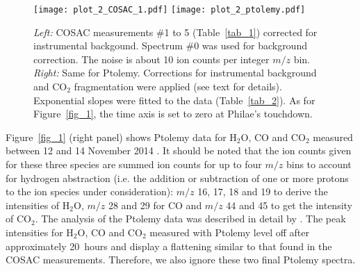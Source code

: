 \documentclass{aa}
\begin{document}
\begin{figure*}
\vspace{-8mm}
   \centering
   \hspace{-9mm}
   \vspace{-0.5cm}
\texttt{[image: plot\_2\_COSAC\_1.pdf]}
\hspace{-16mm}
\texttt{[image: plot\_2\_ptolemy.pdf]}
   \vspace{-5.3cm}
\vspace{-2mm}
\caption[]{
{\em Left:} COSAC measurements \#1 to 5 (Table~\ref{tab_1}) corrected for instrumental backgound. Spectrum \#0 was 
used for background correction.  The noise is about 10 ion counts per integer $m/z$ bin.
{\em Right:} Same for Ptolemy. Corrections for instrumental background and  $\mathrm{CO_2}$ fragmentation were applied
(see text for details). Exponential slopes were fitted to the data (Table~\ref{tab_2}). As for Figure~\ref{fig_1}, the time axis is set to zero at Philae's touchdown.
}
\label{fig_2}
\end{figure*}

Figure~\ref{fig_1} (right panel) shows Ptolemy data for $\mathrm{H_2O}$, CO and $\mathrm{CO_2}$ measured between 
12 and 14 November 2014 \citep{morse2015}. It should be noted that the ion counts given for these 
three species are summed ion counts for up to
four $m/z$ bins to account for hydrogen abstraction (i.e. the addition or subtraction of one or more 
protons to the ion species under consideration): $m/z$ 16, 17, 18 and 19 to 
derive the intensities of $\mathrm{H_2O}$, $m/z$ 28 and 29 for CO and $m/z$ 44 and 
45 to get the intensity of $\mathrm{CO_2}$. The analysis of the Ptolemy data was described in detail by
\citet{morse2015}. 
The peak intensities for $\mathrm{H_2O}$, CO and $\mathrm{CO_2}$ measured with Ptolemy
level off 
after approximately 20~hours and display a  flattening similar to that found in the COSAC 
measurements. Therefore, we also ignore these two final Ptolemy spectra. 
\end{document}
